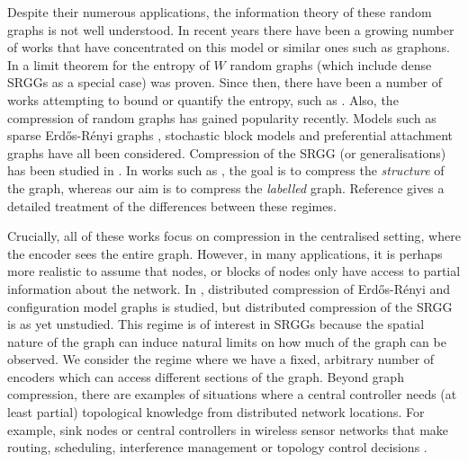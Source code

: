 \documentclass[conference,letterpaper]{IEEEtran}
\begin{document}
Despite their numerous applications, the information theory of these random graphs is not well understood. In recent years there have been a growing number of works that have concentrated on this model or similar ones such as graphons. In \cite{janson2010graphons} a limit theorem for the entropy of $W$ random graphs (which include dense SRGGs as a special case) was proven. Since then, there have been a number of works attempting to bound or quantify the entropy, such as \cite{coon2018entropy, baker2026entropy, coon2018conditional, vippathalla2026entropy}. Also, the compression of random graphs has gained popularity recently. Models such as sparse Erd\H os-R\'enyi graphs \cite{choi_structural_entropy}, stochastic block models \cite{Abbe2016GraphClusters, martin_rate_distortion_sbm, bhatt2023universal} and preferential attachment graphs \cite{luczak_pag} have all been considered. Compression of the SRGG (or generalisations) has been studied in \cite{delgosha_universal_compression, delgosha2022universal, vippathalla2024lossy}. In works such as \cite{choi_structural_entropy, mihai2021structural}, the goal is to compress the \textit{structure} of the graph, whereas our aim is to compress the \textit{labelled} graph. Reference \cite{Paton2022labelled_entropy} gives a detailed treatment of the differences between these regimes. 

Crucially, all of these works focus on compression in the centralised setting, where the encoder sees the entire graph. However, in many applications, it is perhaps more realistic to assume that nodes, or blocks of nodes only have access to partial information about the network. In \cite{delgosha2021distributed}, distributed compression of Erd\H os-R\'enyi and configuration model graphs is studied, but distributed compression of the SRGG is as yet unstudied. This regime is of interest in SRGGs because the spatial nature of the graph can induce natural limits on how much of the graph can be observed. We consider the regime where we have a fixed, arbitrary number of encoders which can access different sections of the graph. Beyond graph compression, there are examples of situations where a central controller needs (at least partial) topological knowledge from distributed network locations. For example, sink nodes or central controllers in wireless sensor networks that make routing, scheduling, interference management or topology control decisions \cite{tunca2013distributed}.
\end{document}
